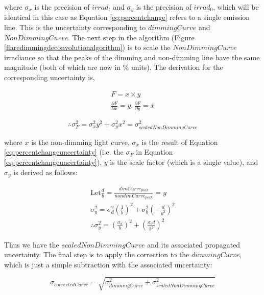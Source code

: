 \noindent where $\sigma _x$ is the precision of $irrad_t$ and $\sigma _y$ is the precision of $irrad_0$, which will be identical in this case as Equation \ref{eq:percentchange} refers to a single emission line. This is the uncertainty corresponding to $dimmingCurve$ and $NonDimmingCurve$. The next step in the algorithm (Figure \ref{flaredimmingdeconvolutionalgorithm}) is to scale the $NonDimmingCurve$ irradiance so that the peaks of the dimming and non-dimming line have the same magnitude (both of which are now in \% units). The derivation for the corresponding uncertainty is, 

\begin{gather*}
    F = x \times y \\
    \frac{\partial F}{\partial x} = y , \frac{\partial F}{\partial y} = x
    \label{eq:scaledbrightcurvederivation}
\end{gather*}

\begin{equation}
    \therefore \sigma^2_F = \sigma^2_x y^2 + \sigma^2_y x^2 = \sigma^2_{scaledNonDimmingCurve}
    \label{eq:scaledbrightcurvestep1}
\end{equation}

\noindent where $x$ is the non-dimming light curve, $\sigma _x$ is the result of Equation \ref{eq:percentchangeuncertainty} (i.e. the $\sigma _F$ in Equation \ref{eq:percentchangeuncertainty}), $y$ is the scale factor (which is a single value), and $\sigma _y$ is derived as follows: 

\begin{gather*}
    \text{Let} \frac{d}{b} = \frac{dimCurve_{peak}}{nondimCurve_{peak}} = y \\
    \sigma^2_y = \sigma^2_d(\frac{1}{b})^2 + \sigma^2_b(-\frac{d}{b^2})^2 \\
    \therefore \sigma^2_y = (\frac{\sigma _d}{b})^2 + (\frac{\sigma _bd}{b^2})^2
    \label{eq:scalefactoruncertainty}
\end{gather*}

Thus we have the $scaledNonDimmingCurve$ and its associated propagated uncertainty. The final step is to apply the correction to the $dimmingCurve$, which is just a simple subtraction with the associated uncertainty: 

\begin{equation}
    \sigma _{correctedCurve} = \sqrt{\sigma^2_{dimmingCurve} + \sigma^2_{scaledNonDimmingCurve}}
    \label{eq:correctedcurveuncertainty}
\end{equation}


